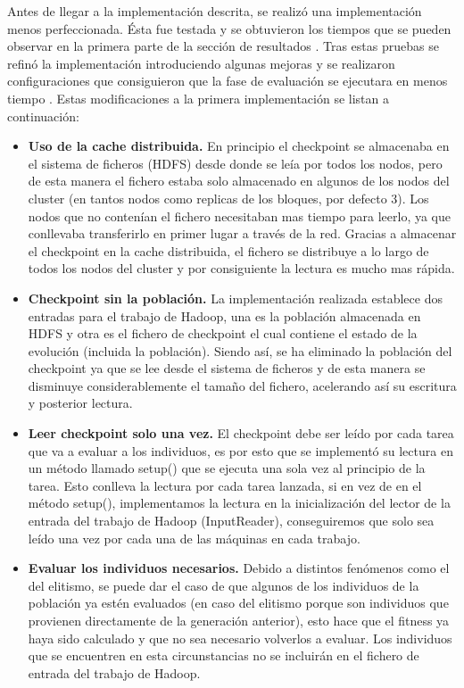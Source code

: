 Antes de llegar a la implementaci\'on descrita, se realiz\'o una implementación menos perfeccionada. \'Esta fue testada y se obtuvieron los tiempos que se pueden observar en la primera parte de la sección de resultados . Tras estas pruebas se refin\'o la implementación introduciendo algunas mejoras y se realizaron configuraciones que consiguieron que la fase de evaluación se ejecutara en menos tiempo . Estas modificaciones a la primera implementación se listan a continuación:
\label{mejoras}

\begin{itemize}
	\item \textbf{Uso de la cache distribuida.} En principio el checkpoint se almacenaba en el sistema de ficheros (HDFS) desde donde se leía por todos los nodos, pero de esta manera el fichero estaba solo almacenado en algunos de los nodos del cluster (en tantos nodos como replicas de los bloques, por defecto 3). Los nodos que no contenían el fichero necesitaban mas tiempo para leerlo, ya que conllevaba transferirlo en primer lugar a través de la red. Gracias a almacenar el checkpoint en la cache distribuida, el fichero se distribuye a lo largo de todos los nodos del cluster y por consiguiente la lectura es mucho mas rápida.
	\item \textbf{Checkpoint sin la población.} La implementación realizada establece dos entradas para el trabajo de Hadoop, una es la población almacenada en HDFS y otra es el fichero de checkpoint el cual contiene el estado de la evolución (incluida la población). Siendo así, se ha eliminado la población del checkpoint ya que se lee desde el sistema de ficheros y de esta manera se disminuye considerablemente el tamaño del fichero, acelerando as\'i su escritura y posterior lectura.
	\item \textbf{Leer checkpoint solo una vez.} El checkpoint debe ser leído por cada tarea que va a evaluar a los individuos, es por esto que se implement\'o su lectura en un método llamado setup() que se ejecuta una sola vez al principio de la tarea. Esto conlleva la lectura por cada tarea lanzada, si en vez de en el método setup(), implementamos la lectura en la inicializaci\'on del lector de la entrada del trabajo de Hadoop (InputReader), conseguiremos que solo sea leído una vez por cada una de las m\'aquinas en cada trabajo.
	\item \textbf{Evaluar los individuos necesarios.} Debido a distintos fenómenos como el del elitismo, se puede dar el caso de que algunos de los individuos de la población ya est\'en evaluados (en caso del elitismo porque son individuos que provienen directamente de la generaci\'on anterior), esto hace que el fitness ya haya sido calculado y que no sea necesario volverlos a evaluar. Los individuos que se encuentren en esta circunstancias no se incluirán en el fichero de entrada del trabajo de Hadoop.		

\end{itemize}
